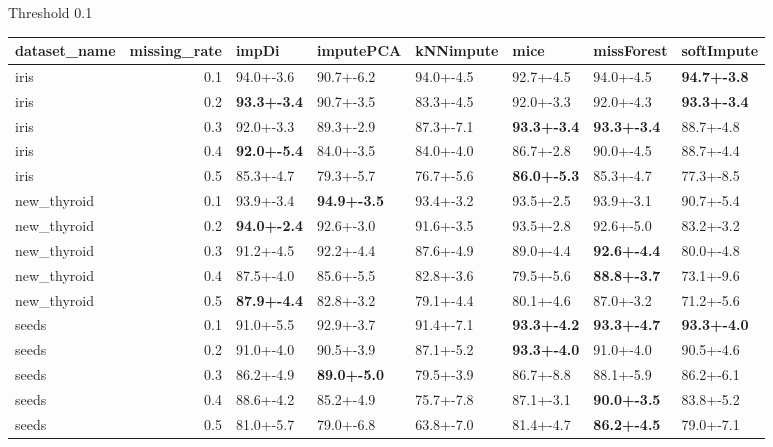

 Threshold 0.1 
 \begin{tabular}{lrllllll}
\toprule
dataset_name &  missing_rate &              impDi &          imputePCA & kNNimpute &               mice &         missForest &         softImpute \\
\midrule
        iris &           0.1 &          94.0+-3.6 &          90.7+-6.2 & 94.0+-4.5 &          92.7+-4.5 &          94.0+-4.5 & \textbf{94.7+-3.8} \\
        iris &           0.2 & \textbf{93.3+-3.4} &          90.7+-3.5 & 83.3+-4.5 &          92.0+-3.3 &          92.0+-4.3 & \textbf{93.3+-3.4} \\
        iris &           0.3 &          92.0+-3.3 &          89.3+-2.9 & 87.3+-7.1 & \textbf{93.3+-3.4} & \textbf{93.3+-3.4} &          88.7+-4.8 \\
        iris &           0.4 & \textbf{92.0+-5.4} &          84.0+-3.5 & 84.0+-4.0 &          86.7+-2.8 &          90.0+-4.5 &          88.7+-4.4 \\
        iris &           0.5 &          85.3+-4.7 &          79.3+-5.7 & 76.7+-5.6 & \textbf{86.0+-5.3} &          85.3+-4.7 &          77.3+-8.5 \\
 new_thyroid &           0.1 &          93.9+-3.4 & \textbf{94.9+-3.5} & 93.4+-3.2 &          93.5+-2.5 &          93.9+-3.1 &          90.7+-5.4 \\
 new_thyroid &           0.2 & \textbf{94.0+-2.4} &          92.6+-3.0 & 91.6+-3.5 &          93.5+-2.8 &          92.6+-5.0 &          83.2+-3.2 \\
 new_thyroid &           0.3 &          91.2+-4.5 &          92.2+-4.4 & 87.6+-4.9 &          89.0+-4.4 & \textbf{92.6+-4.4} &          80.0+-4.8 \\
 new_thyroid &           0.4 &          87.5+-4.0 &          85.6+-5.5 & 82.8+-3.6 &          79.5+-5.6 & \textbf{88.8+-3.7} &          73.1+-9.6 \\
 new_thyroid &           0.5 & \textbf{87.9+-4.4} &          82.8+-3.2 & 79.1+-4.4 &          80.1+-4.6 &          87.0+-3.2 &          71.2+-5.6 \\
       seeds &           0.1 &          91.0+-5.5 &          92.9+-3.7 & 91.4+-7.1 & \textbf{93.3+-4.2} & \textbf{93.3+-4.7} & \textbf{93.3+-4.0} \\
       seeds &           0.2 &          91.0+-4.0 &          90.5+-3.9 & 87.1+-5.2 & \textbf{93.3+-4.0} &          91.0+-4.0 &          90.5+-4.6 \\
       seeds &           0.3 &          86.2+-4.9 & \textbf{89.0+-5.0} & 79.5+-3.9 &          86.7+-8.8 &          88.1+-5.9 &          86.2+-6.1 \\
       seeds &           0.4 &          88.6+-4.2 &          85.2+-4.9 & 75.7+-7.8 &          87.1+-3.1 & \textbf{90.0+-3.5} &          83.8+-5.2 \\
       seeds &           0.5 &          81.0+-5.7 &          79.0+-6.8 & 63.8+-7.0 &          81.4+-4.7 & \textbf{86.2+-4.5} &          79.0+-7.1 \\
\bottomrule
\end{tabular}
